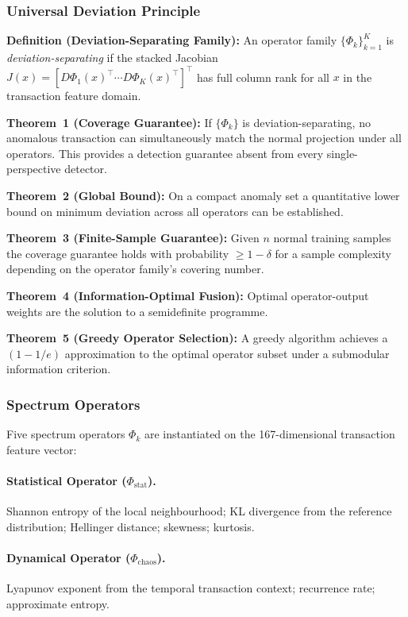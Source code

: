 \documentclass[12pt,a4paper]{article}
\begin{document}
\subsubsection{Universal Deviation Principle}

\textbf{Definition (Deviation-Separating Family):}
An operator family $\{\Phi_k\}_{k=1}^{K}$ is
\emph{deviation-separating} if the stacked Jacobian
$J(x) = [D\Phi_1(x)^\top \cdots D\Phi_K(x)^\top]^\top$
has full column rank for all $x$ in the transaction feature domain.

\textbf{Theorem~1 (Coverage Guarantee):}
If $\{\Phi_k\}$ is deviation-separating, no anomalous transaction
can simultaneously match the normal projection under all operators.
This provides a detection guarantee absent from every single-perspective
detector.

\textbf{Theorem~2 (Global Bound):}
On a compact anomaly set a quantitative lower bound on minimum deviation
across all operators can be established.

\textbf{Theorem~3 (Finite-Sample Guarantee):}
Given $n$ normal training samples the coverage guarantee holds with
probability $\geq 1-\delta$ for a sample complexity depending on the
operator family's covering number.

\textbf{Theorem~4 (Information-Optimal Fusion):}
Optimal operator-output weights are the solution to a semidefinite
programme.

\textbf{Theorem~5 (Greedy Operator Selection):}
A greedy algorithm achieves a $(1-1/e)$ approximation to the optimal
operator subset under a submodular information criterion.

\subsubsection{Spectrum Operators}
\label{sec:ops}

Five spectrum operators $\Phi_k$ are instantiated on the 167-dimensional
transaction feature vector:

\paragraph{Statistical Operator ($\Phi_{\mathrm{stat}}$).}
Shannon entropy of the local neighbourhood; KL divergence from the
reference distribution; Hellinger distance; skewness; kurtosis.

\paragraph{Dynamical Operator ($\Phi_{\mathrm{chaos}}$).}
Lyapunov exponent from the temporal transaction context; recurrence rate;
approximate entropy.
\end{document}
